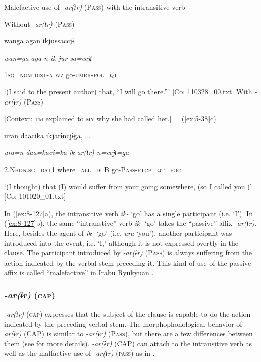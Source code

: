 \ea\label{ex:8-127}
  Malefactive use of \textit{{}-ar(ɨr)} (P\textsc{ass}) with the intransitive verb

\ea Without \textit{{}-ar(ɨr)} (P\textsc{ass})

    {\TM}
\glll  wanga  agan  ikjussaccjɨ

      \textit{wan=ga}  \textit{aga-n}  \textit{ik{}-jur-sa=ccjɨ}

      1\textsc{sg}=\textsc{nom}  \textsc{dist}-\textsc{advz}  go-\textsc{umrk}-\textsc{pol}=\textsc{qt}

\glt ‘(I said to the present author) that, “I will go there.”’ [Co: 110328\_00.txt]
\ex With \textit{{}-ar(ɨr)} (P\textsc{ass})

    [Context: \textsc{tm} explained to \textsc{my} why she had called her.] = (\ref{ex:5-38}c)

    {\TM}
\glll  uran  daacika  ikjarɨncjɨga, ...

      \textit{ura=n}  \textit{daa=kaci=ka}  \textit{ik-ar(ɨr){}-n=ccjɨ=ga}

      2.N\textsc{hon}.\textsc{sg}=\textsc{dat}1  where=\textsc{all}=\textsc{du}B  go-P\textsc{ass}-\textsc{ptcp}=\textsc{qt}=\textsc{foc}

\glt ‘(I thought) that (I) would suffer from your going somewhere, (so I called you.)’ [Co: 101020\_01.txt]
\z

In (\ref{ex:8-127}a), the intransitive verb \textit{ik-} ‘go’ has a single participant (i.e. ‘I’). In (\ref{ex:8-127}b), the same “intranstive” verb \textit{ik-} ‘go’ takes the “passive” affix \textit{{}-ar(ɨr)}. Here, besides the agent of \textit{ik-} ‘go’ (i.e. \textit{ura} ‘you’), another participant was introduced into the event, i.e. ‘I,’ although it is not expressed overtly in the clause. The participant introduced by \textit{{}-ar(ɨr)} (P\textsc{ass}) is always suffering from the action indicated by the verbal stem preceding it. This kind of use of the passive affix is called “malefactive” in Irabu Ryukyuan \citep[493-498]{Shimoji2008}.

\subsubsection{\textit{{}-ar(ɨr)} (\textsc{cap})}
\label{bkm:Ref366851018}
\textit{{}-ar(ɨr)} (\textsc{cap}) expresses that the subject of the clause is capable to do the action indicated by the preceding verbal stem. The morphophonological behavior of \textit{{}-ar(ɨr)} (CAP) is similar to \textit{{}-ar(ɨr)} (P\textsc{ass}), but there are a few differences between them (see  for more details). \textit{{}-ar(ɨr)} (CAP) can attach to the intransitive verb as well as the malfactive use of \textit{{}-ar(ɨr)} (\textsc{pass}) as in .

